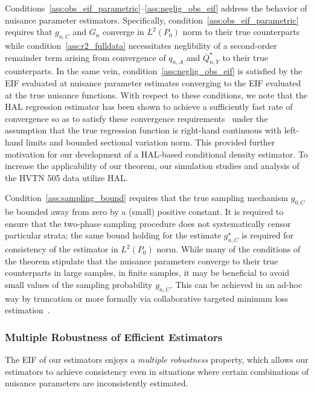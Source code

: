 Conditions~\ref{ass:obs_eif_parametric}--\ref{ass:neglig_obs_eif}
address the behavior of nuisance parameter estimators. Specifically,
condition~\ref{ass:obs_eif_parametric} requires that $g_{n,C}$ and $G_n$
converge in $L^2(P_0)$ norm to their true counterparts while
condition~\ref{ass:r2_fulldata} necessitates neglibility of a second-order
remainder term arising from convergence of $q_{n,A}$ and
$\overline{Q}^{\star}_{n,Y}$ to their true counterparts. In the same vein,
condition~\ref{ass:neglig_obs_eif} is satisfied by the EIF evaluated at
nuisance parameter estimates converging to the EIF evaluated at the true
nuisance functions. With respect to these conditions, we note that the HAL
regression estimator has been shown to achieve a sufficiently fast rate of
convergence so as to satisfy these convergence
requirements~\citep{vdl2017generally, bibaut2019fast} under the assumption that
the true regression function is right-hand continuous with left-hand limits and
bounded sectional variation norm. This provided further motivation for our
development of a HAL-based conditional density estimator. To increase the
applicability of our theorem, our simulation studies and analysis of the HVTN
505 data utilize HAL.

Condition~\ref{ass:sampling_bound} requires that the true sampling
mechanism $g_{0,C}$ be bounded away from zero by a (small) positive constant. It
is required to ensure that the two-phase sampling procedure does not
systematically censor particular strata; the same bound holding for the estimate
$g^{\star}_{n,C}$ is required for consistency of the estimator in $L^2(P_0)$
norm. While many of the conditions of the theorem stipulate that the nuisance
parameters converge to their true counterparts in large samples, in finite
samples, it may be beneficial to avoid small values of the sampling probability
$g_{n,C}$. This can be achieved in an ad-hoc way by truncation or more formally
via collaborative targeted minimum loss estimation~\citep{vdl2010collaborative}.

\subsubsection{Multiple Robustness of Efficient Estimators}\label{mult_robust}

The EIF of our estimators enjoys a \textit{multiple robustness} property, which
allows our estimators to achieve consistency even in situations where certain
combinations of nuisance parameters are inconsistently estimated.

